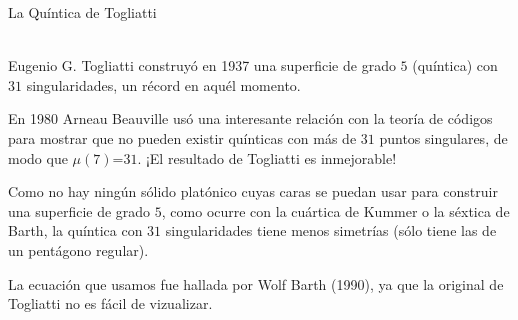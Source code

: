 \documentclass[es]{../../common/SurferDesc}%
\begin{document}
\footnotesize


\begin{surferPage}
  \begin{surferTitle}La Quíntica de Togliatti\end{surferTitle}  \\
    Eugenio G. Togliatti construyó en 1937 una superficie de grado $5$ (quíntica)
    con $31$ singularidades, un récord en aquél momento.

    En 1980 Arneau Beauville usó una interesante relación con la teoría de códigos 
    para mostrar que no pueden existir quínticas con más de $31$ puntos singulares,
    de modo que $\mu(7)$=$31$. ¡El resultado de Togliatti es inmejorable!
    
    Como no hay ningún sólido platónico cuyas caras se puedan usar para construir una 
    superficie de grado $5$, como ocurre con la cuártica de Kummer o la séxtica de Barth, 
    la quíntica con $31$ singularidades tiene menos simetrías (sólo tiene las de un pentágono regular).

 La ecuación que usamos fue hallada por Wolf Barth (1990), ya que la original de Togliatti no es fácil de vizualizar.


  \begin{surferText}
     \end{surferText}
\end{surferPage}
\end{document}

